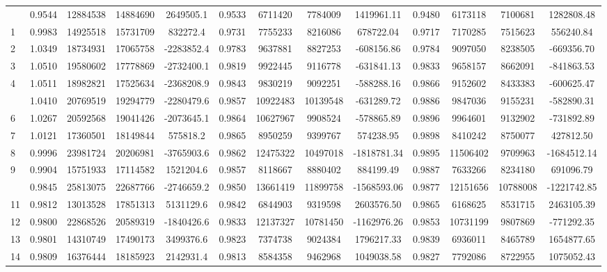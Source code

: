 \documentclass[
  12pt,
]{article}
\begin{document}
\begin{longtable}[t]{lcccccccccccc}
\endfoot
\bottomrule
\endlastfoot
0 & 0.9544 & 12884538 & 14884690 & 2649505.1 & 0.9533 & 6711420 & 7784009 & 1419961.11 & 0.9480 & 6173118 & 7100681 & 1282808.48\\
1 & 0.9983 & 14925518 & 15731709 & 832272.4 & 0.9731 & 7755233 & 8216086 & 678722.04 & 0.9717 & 7170285 & 7515623 & 556240.84\\
2 & 1.0349 & 18734931 & 17065758 & -2283852.4 & 0.9783 & 9637881 & 8827253 & -608156.86 & 0.9784 & 9097050 & 8238505 & -669356.70\\
3 & 1.0510 & 19580602 & 17778869 & -2732400.1 & 0.9819 & 9922445 & 9116778 & -631841.13 & 0.9833 & 9658157 & 8662091 & -841863.53\\
4 & 1.0511 & 18982821 & 17525634 & -2368208.9 & 0.9843 & 9830219 & 9092251 & -588288.16 & 0.9866 & 9152602 & 8433383 & -600625.47\\
\addlinespace
5 & 1.0410 & 20769519 & 19294779 & -2280479.6 & 0.9857 & 10922483 & 10139548 & -631289.72 & 0.9886 & 9847036 & 9155231 & -582890.31\\
6 & 1.0267 & 20592568 & 19041426 & -2073645.1 & 0.9864 & 10627967 & 9908524 & -578865.89 & 0.9896 & 9964601 & 9132902 & -731892.89\\
7 & 1.0121 & 17360501 & 18149844 & 575818.2 & 0.9865 & 8950259 & 9399767 & 574238.95 & 0.9898 & 8410242 & 8750077 & 427812.50\\
8 & 0.9996 & 23981724 & 20206981 & -3765903.6 & 0.9862 & 12475322 & 10497018 & -1818781.34 & 0.9895 & 11506402 & 9709963 & -1684512.14\\
9 & 0.9904 & 15751933 & 17114582 & 1521204.6 & 0.9857 & 8118667 & 8880402 & 884199.49 & 0.9887 & 7633266 & 8234180 & 691096.79\\
\addlinespace
10 & 0.9845 & 25813075 & 22687766 & -2746659.2 & 0.9850 & 13661419 & 11899758 & -1568593.06 & 0.9877 & 12151656 & 10788008 & -1221742.85\\
11 & 0.9812 & 13013528 & 17851313 & 5131129.6 & 0.9842 & 6844903 & 9319598 & 2603576.50 & 0.9865 & 6168625 & 8531715 & 2463105.39\\
12 & 0.9800 & 22868526 & 20589319 & -1840426.6 & 0.9833 & 12137327 & 10781450 & -1162976.26 & 0.9853 & 10731199 & 9807869 & -771292.35\\
13 & 0.9801 & 14310749 & 17490173 & 3499376.6 & 0.9823 & 7374738 & 9024384 & 1796217.33 & 0.9839 & 6936011 & 8465789 & 1654877.65\\
14 & 0.9809 & 16376444 & 18185923 & 2142931.4 & 0.9813 & 8584358 & 9462968 & 1049038.58 & 0.9827 & 7792086 & 8722955 & 1075052.43\\

\end{longtable}
\end{document}

